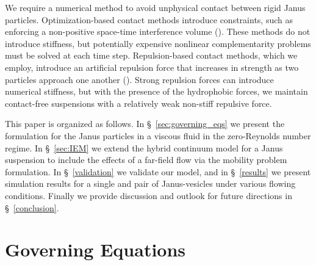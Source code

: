 \documentclass[lineno]{jfm}
\begin{document}
We require a numerical method to avoid unphysical contact between rigid
Janus particles. Optimization-based contact methods introduce
constraints, such as enforcing a non-positive space-time interference
volume (\cite{lu-rah-zor2017, Lukas19, yan-cor-mal-vee-she2020}). These
methods do not introduce stiffness, but potentially expensive nonlinear
complementarity problems must be solved at each time step.
Repulsion-based contact methods, which we employ, introduce an
artificial repulsion force that increases in strength as two particles
approach one another (\cite{glo-pan-hes-jos-per2001, fen-mic2004,
kab-qua-bir2018}). Strong repulsion forces can introduce numerical
stiffness, but with the presence of the hydrophobic forces, we maintain
contact-free suspensions with a relatively weak non-stiff repulsive
force.

This paper is organized as follows. In \S~\ref{sec:governing_eqs} we
present the formulation for the Janus particles in a viscous fluid in
the zero-Reynolds number regime. In \S~\ref{sec:IEM} we extend the
hybrid continuum model for a Janus suspension to include the effects of
a far-field flow via the mobility problem formulation. In
\S~\ref{validation} we validate our model, and in \S~\ref{results} we
present simulation results for a single and pair of Janus-vesicles under
various flowing conditions. Finally we provide discussion and outlook
for future directions in \S~\ref{conclusion}.

\section{Governing Equations\label{sec:governing_eqs}}
\end{document}
